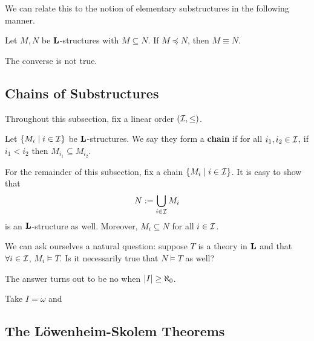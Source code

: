 We can relate this to the notion of elementary substructures in the following manner.

\begin{boxtheorem}
    Let $M, N$ be $\mathbf{L}$-structures with $M \subseteq N$. If $M \preceq N$, then $M \equiv N$.
\end{boxtheorem}

The converse is not true.

\begin{boxcexample}
    \sorry
\end{boxcexample}

\subsection{Chains of Substructures}

Throughout this subsection, fix a linear order $\left( \mathcal{I}, \le \right)$.

\begin{boxdefinition}[Chain]
    Let $\left\{ M_{i} \; \middle\vert \; i \in \mathcal{I} \right\}$ be $\mathbf{L}$-structures. We say they form a \textbf{chain} if for all $i_1, i_2 \in \mathcal{I}$, if $i_1 < i_2$ then $M_{i_1} \subseteq M_{i_2}$.
\end{boxdefinition}

For the remainder of this subsection, fix a chain $\left\{ M_{i} \; \middle\vert \; i \in \mathcal{I} \right\}$. It is easy to show that
\begin{align*}
    N := \bigcup_{i \in \mathcal{I}} M_i
\end{align*}
is an $\mathbf{L}$-structure as well. Moreover, $M_i \subseteq N$ for all $i \in \mathcal{I}$.

We can ask ourselves a natural question: suppose $T$ is a theory in $\mathbf{L}$ and that $\forall i \in \mathcal{I}$, $M_i \models T$. Is it necessarily true that $N \models T$ as well?

The answer turns out to be no when $\left\lvert I \right\rvert \geq \aleph_0$.

\begin{boxcexample}
    Take $I = \omega$ and 
\end{boxcexample}

\subsection{The Löwenheim-Skolem Theorems}